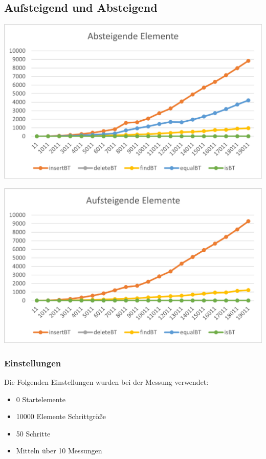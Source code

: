 \documentclass[11pt]{article}
\begin{document}
    \subsection{Aufsteigend und Absteigend}\label{subsec:average}

    \begin{center}
        \includegraphics[width=0.9\columnwidth] {ZeitAb.pdf}
    \end{center}
    \begin{center}
        \includegraphics[width=0.9\columnwidth] {ZeitAuf.pdf}
    \end{center}

    \subsubsection{Einstellungen}
    Die Folgenden Einstellungen wurden bei der Messung verwendet:
    \begin{itemize}
        \item 0 Startelemente
        \item 10000 Elemente Schrittgröße
        \item 50 Schritte
        \item Mitteln über 10 Messungen
    \end{itemize}
\end{document}
